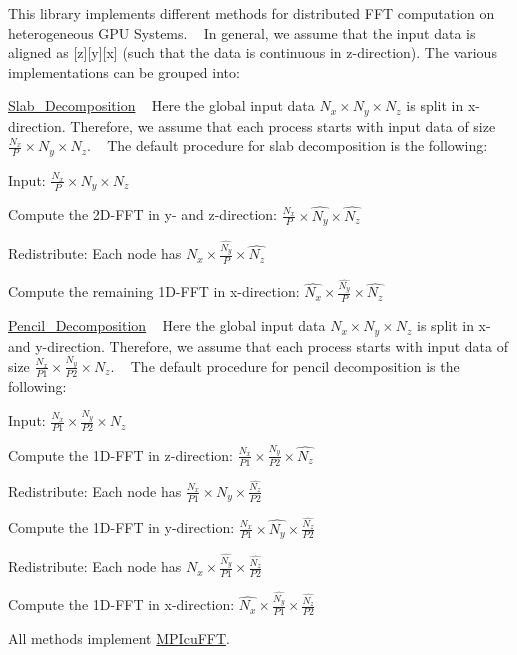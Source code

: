 This library implements different methods for distributed FFT computation on heterogeneous GPU Systems. ~\newline
In general, we assume that the input data is aligned as \mbox{[}z\mbox{]}\mbox{[}y\mbox{]}\mbox{[}x\mbox{]} (such that the data is continuous in z-\/direction). The various implementations can be grouped into\+:


\begin{DoxyItemize}
\item \mbox{\hyperlink{Slab_Decomposition}{Slab\+\_\+\+Decomposition}} ~\newline
 Here the global input data $N_x \times N_y \times N_z$ is split in x-\/direction. Therefore, we assume that each process starts with input data of size $\frac{N_x}{P} \times N_y \times N_z$. ~\newline
 The default procedure for slab decomposition is the following\+:
\begin{DoxyEnumerate}
\item Input\+: $\frac{N_x}{P} \times N_y \times N_z$
\item Compute the 2D-\/\+FFT in y-\/ and z-\/direction\+: $\frac{N_x}{P} \times \hat{N_y} \times \hat{N_z}$
\item Redistribute\+: Each node has $N_x \times \frac{\hat{N_y}}{P} \times \hat{N_z}$
\item Compute the remaining 1D-\/\+FFT in x-\/direction\+: $\hat{N_x} \times \frac{\hat{N_y}}{P} \times \hat{N_z}$
\end{DoxyEnumerate}
\item \mbox{\hyperlink{Pencil_Decomposition}{Pencil\+\_\+\+Decomposition}} ~\newline
 Here the global input data $N_x \times N_y \times N_z$ is split in x-\/ and y-\/direction. Therefore, we assume that each process starts with input data of size $\frac{N_x}{P1} \times \frac{N_y}{P2} \times N_z$. ~\newline
 The default procedure for pencil decomposition is the following\+:
\begin{DoxyEnumerate}
\item Input\+: $\frac{N_x}{P1} \times \frac{N_y}{P2} \times N_z$
\item Compute the 1D-\/\+FFT in z-\/direction\+: $\frac{N_x}{P1} \times \frac{N_y}{P2} \times \hat{N_z}$
\item Redistribute\+: Each node has $\frac{N_x}{P1} \times N_y \times \frac{\hat{N_z}}{P2}$
\item Compute the 1D-\/\+FFT in y-\/direction\+: $\frac{N_x}{P1} \times \hat{N_y} \times \frac{\hat{N_z}}{P2}$
\item Redistribute\+: Each node has $N_x \times \frac{\hat{N_y}}{P1} \times \frac{\hat{N_z}}{P2}$
\item Compute the 1D-\/\+FFT in x-\/direction\+: $\hat{N_x} \times \frac{\hat{N_y}}{P1} \times \frac{\hat{N_z}}{P2}$
\end{DoxyEnumerate}
\end{DoxyItemize}

All methods implement \mbox{\hyperlink{classMPIcuFFT}{MPIcu\+FFT}}. 